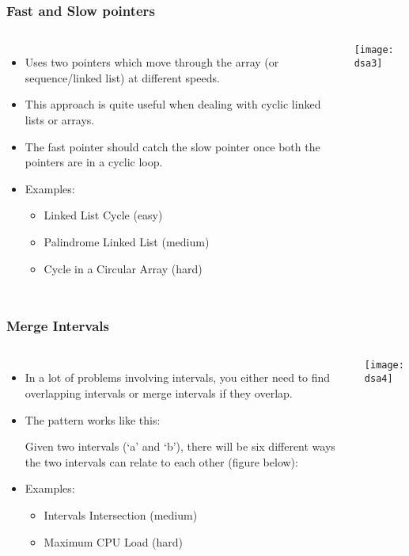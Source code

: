 \begin{frame}[fragile]
	\frametitle{Fast and Slow pointers}
	
	\begin{columns}[T]
			\begin{itemize}
				\item Uses two pointers which move through the array (or sequence/linked list) at different speeds. 
				\item This approach is quite useful when dealing with cyclic linked lists or arrays.
				\item The fast pointer should catch the slow pointer once both the pointers are in a cyclic loop.
				\item Examples:
			\begin{itemize}
				\item Linked List Cycle (easy)
				\item Palindrome Linked List (medium)
				\item Cycle in a Circular Array (hard)
			\end{itemize}

			\end{itemize}
			
		
\begin{center}
\texttt{[image: dsa3]}
\end{center}			
	\end{columns}		
\end{frame}

\begin{frame}[fragile]
	\frametitle{Merge Intervals}
	\begin{columns}[T]
			\begin{itemize}
				\item In a lot of problems involving intervals, you either need to find overlapping intervals or merge intervals if they overlap. 
				\item The pattern works like this:

Given two intervals (‘a’ and ‘b’), there will be six different ways the two intervals can relate to each other (figure below):
				\item Examples:
			\begin{itemize}
				\item Intervals Intersection (medium)
				\item Maximum CPU Load (hard)
			\end{itemize}

			\end{itemize}
			
		
\begin{center}
\texttt{[image: dsa4]}
\end{center}		
		\end{columns}		
\end{frame}

